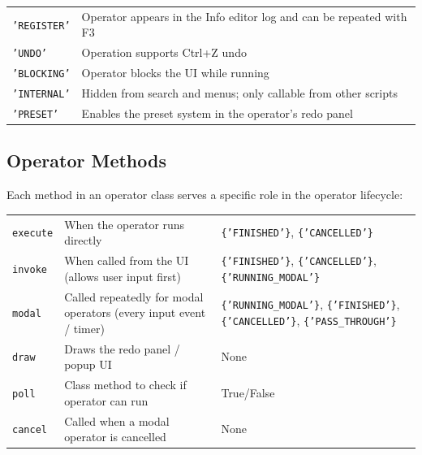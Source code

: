 \begin{center}
\begin{tabularx}{\textwidth}{L{3cm}X}
\toprule
{}
 &  \\
\midrule
\texttt{'REGISTER'} & Operator appears in the Info editor log and can be repeated with F3 \\
\texttt{'UNDO'} & Operation supports Ctrl+Z undo \\
\texttt{'BLOCKING'} & Operator blocks the UI while running \\
\texttt{'INTERNAL'} & Hidden from search and menus; only callable from other scripts \\
\texttt{'PRESET'} & Enables the preset system in the operator's redo panel \\
\bottomrule
\end{tabularx}
\end{center}

\subsection{Operator Methods}

Each method in an operator class serves a specific role in the operator lifecycle:

\begin{center}
\begin{tabularx}{\textwidth}{L{2.2cm}X L{3cm}}
\toprule
{}
 &  &  \\
\midrule
\texttt{execute} & When the operator runs directly & \texttt{\{'FINISHED'\}}, \texttt{\{'CANCELLED'\}} \\
\texttt{invoke} & When called from the UI (allows user input first) & \texttt{\{'FINISHED'\}}, \texttt{\{'CANCELLED'\}}, \texttt{\{'RUNNING\_MODAL'\}} \\
\texttt{modal} & Called repeatedly for modal operators (every input event / timer) & \texttt{\{'RUNNING\_MODAL'\}}, \texttt{\{'FINISHED'\}}, \texttt{\{'CANCELLED'\}}, \texttt{\{'PASS\_THROUGH'\}} \\
\texttt{draw} & Draws the redo panel / popup UI & None \\
\texttt{poll} & Class method to check if operator can run & True/False \\
\texttt{cancel} & Called when a modal operator is cancelled & None \\
\bottomrule
\end{tabularx}
\end{center}

